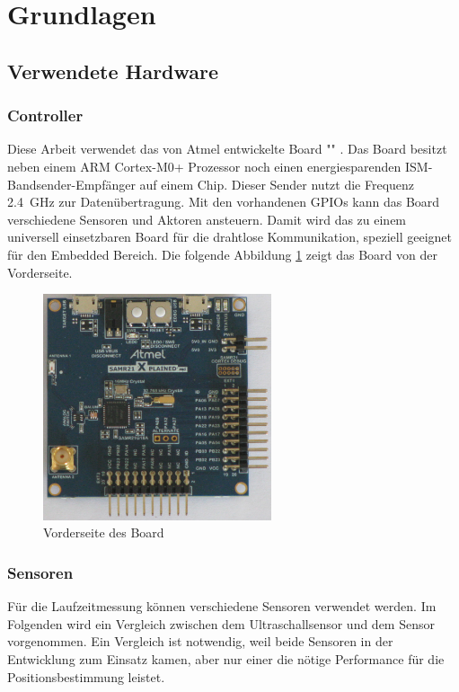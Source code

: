 \newpage
\section{Grundlagen}

\subsection{Verwendete Hardware}
\subsubsection{Controller}
Diese Arbeit verwendet das von Atmel entwickelte Board "\board" \cite{src_SAMR}. Das Board besitzt neben einem ARM Cortex-M0+ Prozessor noch einen energiesparenden ISM-Bandsender-Empfänger auf einem Chip. Dieser Sender nutzt die Frequenz \SI{2,4}{\giga \hertz} zur Datenübertragung. Mit den vorhandenen GPIOs kann das Board verschiedene Sensoren und Aktoren ansteuern. Damit wird das \board \platz zu einem universell einsetzbaren Board für die drahtlose Kommunikation, speziell geeignet für den Embedded Bereich. Die folgende Abbildung \ref{img:samr21} zeigt das \board Board von der Vorderseite.
\begin{figure}[!ht]
	\centering
	\includegraphics[width=0.6\textwidth]{images/samr21.png}
	\caption{Vorderseite des \board Board}
	\label{img:samr21}
\end{figure}

\subsubsection{Sensoren}
Für die Laufzeitmessung können verschiedene Sensoren verwendet werden. Im Folgenden wird ein Vergleich zwischen dem Ultraschallsensor \ultraschall \platz und dem \microphone \platz Sensor vorgenommen. Ein Vergleich ist notwendig, weil beide Sensoren in der Entwicklung zum Einsatz kamen, aber nur einer die nötige Performance für die Positionsbestimmung leistet.

